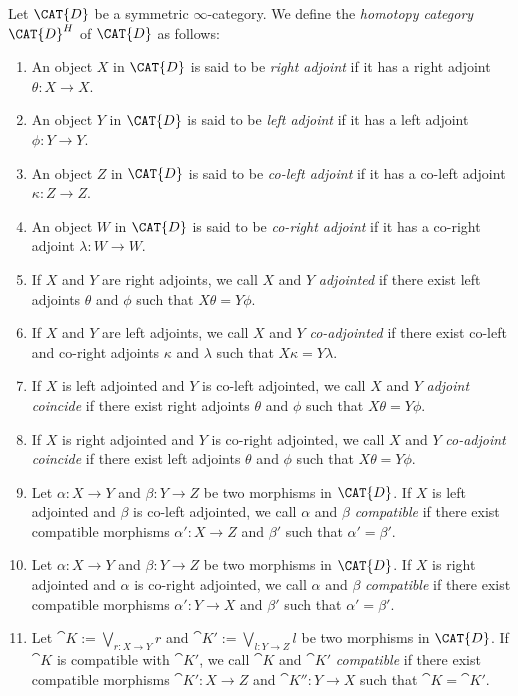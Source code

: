 \documentclass[a4paper,reqno,oneside]{article}
\begin{document}
{\begin{definition}
Let $\CAT{D}$ be a symmetric $\infty$-category. We define the \emph{homotopy category} $\CAT{D}^H$ of $\CAT{D}$ as follows:
\begin{enumerate}
\item An object $X$ in $\CAT{D}$ is said to be \emph{right adjoint} if it has a right adjoint $\theta: X \rightarrow X$.
\item An object $Y$ in $\CAT{D}$ is said to be \emph{left adjoint} if it has a left adjoint $\phi: Y \rightarrow Y$.
\item An object $Z$ in $\CAT{D}$ is said to be \emph{co-left adjoint} if it has a co-left adjoint $\kappa: Z \rightarrow Z$.
\item An object $W$ in $\CAT{D}$ is said to be \emph{co-right adjoint} if it has a co-right adjoint $\lambda: W \rightarrow W$.
\item If $X$ and $Y$ are right adjoints, we call $X$ and $Y$ \emph{adjointed} if there exist left adjoints $\theta$ and $\phi$ such that $X \theta = Y \phi$.
\item If $X$ and $Y$ are left adjoints, we call $X$ and $Y$ \emph{co-adjointed} if there exist co-left and co-right adjoints $\kappa$ and $\lambda$ such that $X \kappa = Y \lambda$.
\item If $X$ is left adjointed and $Y$ is co-left adjointed, we call $X$ and $Y$ \emph{adjoint coincide} if there exist right adjoints $\theta$ and $\phi$ such that $X \theta = Y \phi$.
\item If $X$ is right adjointed and $Y$ is co-right adjointed, we call $X$ and $Y$ \emph{co-adjoint coincide} if there exist left adjoints $\theta$ and $\phi$ such that $X \theta = Y \phi$.
\item Let $\alpha: X \rightarrow Y$ and $\beta: Y \rightarrow Z$ be two morphisms in $\CAT{D}$. If $X$ is left adjointed and $\beta$ is co-left adjointed, we call $\alpha$ and $\beta$ \emph{compatible} if there exist compatible morphisms $\alpha' : X \rightarrow Z$ and $\beta'$ such that $\alpha' = \beta'$. 
\item Let $\alpha: X \rightarrow Y$ and $\beta: Y \rightarrow Z$ be two morphisms in $\CAT{D}$. If $X$ is right adjointed and $\alpha$ is co-right adjointed, we call $\alpha$ and $\beta$ \emph{compatible} if there exist compatible morphisms $\alpha' : Y \rightarrow X$ and $\beta'$ such that $\alpha' = \beta'$. 
\item Let $\cat{K} := \bigvee_{r: X \rightarrow Y} r$ and $\cat{K'} := \bigvee_{l: Y \rightarrow Z} l$ be two morphisms in $\CAT{D}$. If $\cat{K}$ is compatible with $\cat{K'}$, we call $\cat{K}$ and $\cat{K'}$ \emph{compatible} if there exist compatible morphisms $\cat{K}': X \rightarrow Z$ and $\cat{K}'': Y \rightarrow X$ such that $\cat{K} = \cat{K}'$. 
\end{enumerate}
\end{definition}

}
\end{document}
